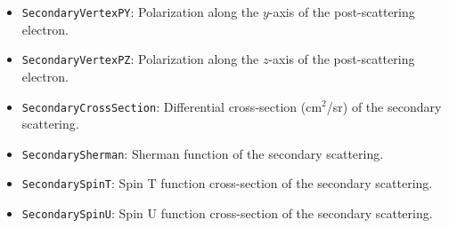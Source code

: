 \documentclass[11pt]{article}
\begin{document}
\begin{itemize}
 \item \texttt{SecondaryVertexPY}: Polarization along the $y$-axis of the post-scattering electron.
 \item \texttt{SecondaryVertexPZ}: Polarization along the $z$-axis of the post-scattering electron.
 \item \texttt{SecondaryCrossSection}: Differential cross-section (cm$^2$/sr) of the secondary scattering.
 \item \texttt{SecondarySherman}: Sherman function of the secondary scattering.
 \item \texttt{SecondarySpinT}: Spin T function cross-section of the secondary scattering.
 \item \texttt{SecondarySpinU}: Spin U function cross-section of the secondary scattering.
\end{itemize}
\end{document}
